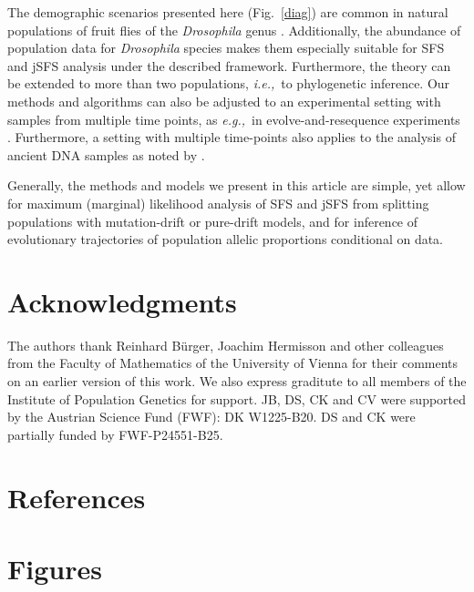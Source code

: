\documentclass[preprint]{elsarticle}
\newcommand\eg{{\it e.g.,}}
\newcommand\ie{{\it i.e.,}}
\begin{document}
The demographic scenarios presented here (Fig.~\ref{diag}) are common in natural populations of fruit flies of the \textit{Drosophila} genus \citep[\eg][]{Li06,Zeng10a,Pool12}. Additionally, the abundance of population data for \textit{Drosophila} species makes them especially suitable for SFS and jSFS analysis under the described framework. Furthermore, the theory can be extended to more than two populations, \ie\ to phylogenetic inference. Our methods and algorithms can also be adjusted to an experimental setting with samples from multiple time points, as \eg\ in evolve-and-resequence experiments \citep{Kofl14}. Furthermore, a setting with multiple time-points also applies to the analysis of ancient DNA samples as noted by \citet{Stei14}.

Generally, the methods and models we present in this article are simple, yet allow for maximum (marginal) likelihood analysis of SFS and jSFS from splitting populations with mutation-drift or pure-drift models, and for inference of evolutionary trajectories of population allelic proportions conditional on data. 

\section*{Acknowledgments}

The authors thank Reinhard B\"urger, Joachim Hermisson and other colleagues from the Faculty of Mathematics of the University of Vienna for their comments on an earlier version of this work. We also express graditute to all members of the Institute of Population Genetics for support. JB, DS, CK and CV were supported by the Austrian Science Fund (FWF): DK W1225-B20. DS and CK were partially funded by FWF-P24551-B25.
\section*{References}



\newpage

\section*{Figures}
\end{document}
